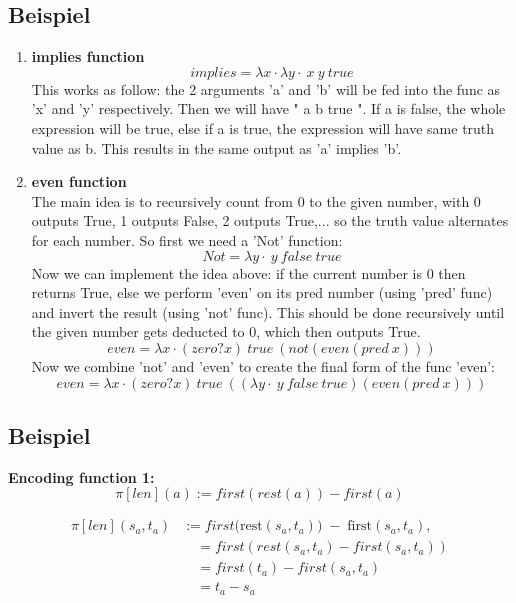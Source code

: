 \documentclass[10pt, a4paper]{article}
\newcounter{bsp}
\newcommand{\task}{\stepcounter{bsp}\subsection*{Beispiel \arabic{bsp}}}
\begin{document}
\task
\begin{enumerate}
 \item \textbf{implies function}\\
\[
implies = \lambda x  \cdot \lambda y  \cdot \ x \ y \ true
\]
This works as follow: the 2 arguments 'a' and 'b' will be fed into the func as 'x' and 'y' respectively. Then we will have " a b true ". If a is false, the whole expression will be true, else if a is true, the expression will have same truth value as b. This results in the same output as 'a' implies 'b'. \\


 \item \textbf{even function}\\
 The main idea is to recursively count from 0 to the given number, with 0 outputs True, 1 outputs False, 2 outputs True,... so the truth value alternates for each number. So first we need a 'Not' function:\\
 \[
 Not = \lambda y \cdot  \ y \ false \ true
 \]
 Now we can implement the idea above: if the current number is 0 then returns True, else we perform 'even' on its pred number (using 'pred' func) and invert the result (using 'not' func). This should be done recursively until the given number gets deducted to 0, which then outputs True.
 \[
 even = \lambda x \cdot (zero? x) \ true \ (not (even (pred \ x)))
 \]
 Now we combine 'not' and 'even' to create the final form of the func 'even':
 \[
 even = \lambda x \cdot (zero? x) \ true \ ((\lambda y \cdot  \ y \ false \ true) (even (pred \ x)))
 \]
 
\end{enumerate}



\task
\textbf{Encoding function 1: }
     \[\pi[len](a) := first(rest(a)) - first(a)\]

   \[
\begin{aligned}
\pi[{len}](s_a, t_a)
  &:=first\bigl(\mathrm{rest}(s_a, t_a)\bigr)
      \;-\;\mathrm{first}(s_a, t_a),\\
  &\quad= first(rest(s_a, t_a) - first(s_a, t_a)) \\
  &\quad= first(t_a) - first(s_a, t_a) \\
  &\quad= t_a - s_a
\end{aligned}
\]
\end{document}
